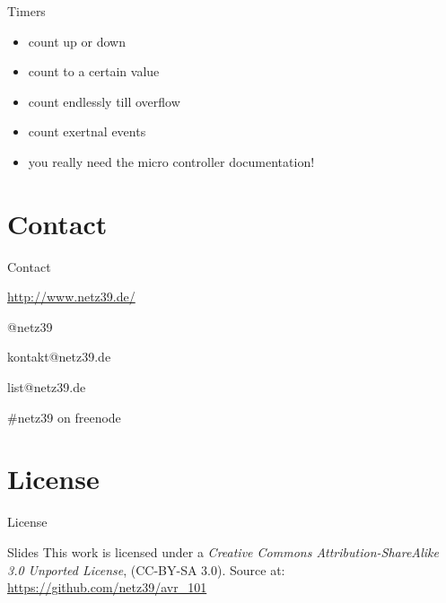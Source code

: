 \documentclass{beamer}
\begin{document}
\begin{frame}{Timers}
    \begin{itemize}
        \item count up or down
        \item count to a certain value
        \item count endlessly till overflow
        \item count exertnal events
        \pause
        \item you really need the micro controller documentation!
    \end{itemize}
\end{frame}



\section{Contact}

\begin{frame}{Contact}
    \begin{center}
        \begin{description}
            \item[WWW] \url{http://www.netz39.de/}
            \item[Twitter/identi.ca] @netz39
            \item[E-Mail] kontakt@netz39.de
            \item[Mailingliste] list@netz39.de
            \item[IRC] \#netz39 on freenode
        \end{description}
    \end{center}
\end{frame}

\appendix

\section{License}

\begin{frame}{License}
    \begin{block}{Slides}
        This work is licensed under a \emph{Creative Commons
        Attribution-ShareAlike 3.0 Unported License}, (CC-BY-SA 3.0).
        Source at: \url{https://github.com/netz39/avr_101}
    \end{block}
\end{frame}
\end{document}
